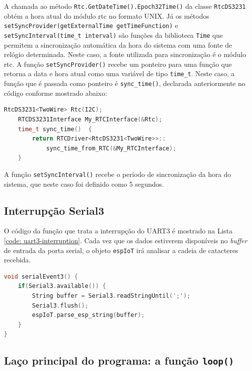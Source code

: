A chamada ao método \texttt{Rtc.GetDateTime().Epoch32Time()} da classe \texttt{RtcDS3231} obtém a hora atual do módulo \acrshort{rtc} no formato UNIX. Já os métodos \texttt{setSyncProvider(getExternalTime getTimeFunction)} e \texttt{setSyncInterval(time\_t interval)} são funções da biblioteca \texttt{Time} que permitem a sincronização automática da hora do sistema com uma fonte de relógio determinada. Neste caso, a fonte utilizada para sincronização é o módulo \acrshort{rtc}. A função \texttt{setSyncProvider()} recebe um ponteiro para uma função que retorna a data e hora atual como uma variável de tipo \texttt{time\_t}. Neste caso, a função que é passada como ponteiro é \texttt{sync\_time()}, declarada anteriormente no código conforme mostrado abaixo: 

\begin{lstlisting}[language=C++]
    RtcDS3231<TwoWire> Rtc(I2C);
    RTCDS3231Interface My_RTCInterface(&Rtc);
    time_t sync_time()  { 
        return RTCDriver<RtcDS3231<TwoWire>>::
            sync_time_from_RTC(&My_RTCInterface);
    }
\end{lstlisting}

A função \texttt{setSyncInterval()} recebe o período de sincronização da hora do sistema, que neste caso foi definido como 5 segundos.

\subsection{Interrupção Serial3}

O código da função que trata a interrupção do UART3 é mostrado na Lista \ref{code: uart3-interruption}. Cada vez que os dados estiverem disponíveis no \textit{buffer} de entrada da porta serial, o objeto \texttt{espIoT} irá analisar a cadeia de catacteres recebida.

\begin{lstlisting}[language=C++, caption=Código para tratamento da interrupção da porta serial UART3]
void serialEvent3() {
    if(Serial3.available()) {
        String buffer = Serial3.readStringUntil(';');
        Serial3.flush();
        espIoT.parse_esp_string(buffer);
    }
}
\end{lstlisting}
\label{code: uart3-interruption}

\subsection{Laço principal do programa: a função \texttt{loop()}}

